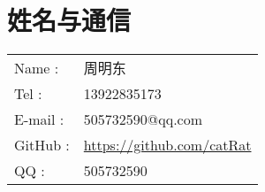 \chapter{姓名与通信}
\begin{tabular}{ll}
\hline
  Name : & 周明东 \\
  Tel : & 13922835173 \\
  E-mail : & 505732590@qq.com \\
  GitHub : & \url{https://github.com/catRat} \\
  QQ : & 505732590 \\
  \hline
\end{tabular}
